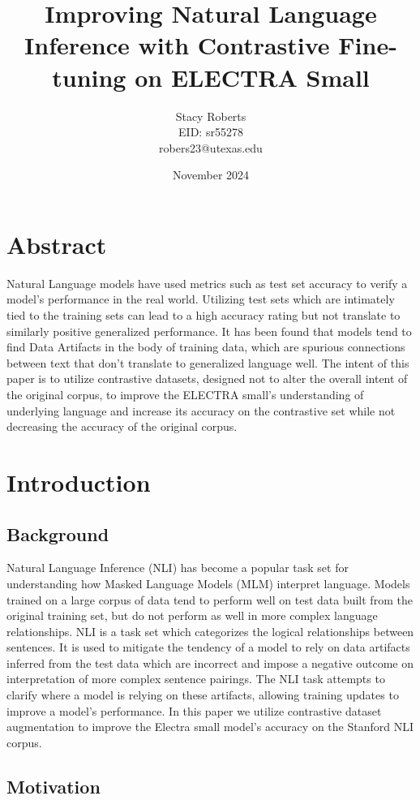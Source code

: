 \documentclass[11pt]{article}
\title{Improving Natural Language Inference with Contrastive Fine-tuning on ELECTRA Small}
\author{Stacy Roberts \\ EID: sr55278 \\robers23@utexas.edu}
\date{November 2024}
\begin{document}
\maketitle


\section*{Abstract}
Natural Language models have used metrics such as test set accuracy to verify a model's performance in the real world. Utilizing test sets which are intimately tied to the training sets can lead to a high accuracy rating but not translate to similarly positive generalized performance. It has been found that models tend to find Data Artifacts in the body of training data, which are spurious connections between text that don't translate to generalized language well. The intent of this paper is to utilize contrastive datasets, designed not to alter the overall intent of the original corpus, to improve the ELECTRA small's understanding of underlying language and increase its accuracy on the contrastive set while not decreasing the accuracy of the original corpus.

\section{Introduction}
\subsection{Background}
Natural Language Inference (NLI) has become a popular task set for understanding how Masked Language Models (MLM) interpret language. Models trained on a large corpus of data tend to perform well on test data built from the original training set, but do not perform as well in more complex language relationships.  NLI is a task set which categorizes the logical relationships between sentences.  It is used to mitigate the tendency of a model to rely on data artifacts inferred from the test data which are incorrect and impose a negative outcome on interpretation of more complex sentence pairings. The NLI task attempts to clarify where a model is relying on these artifacts, allowing training updates to improve a model's performance. In this paper we utilize contrastive dataset augmentation to improve the Electra small model's accuracy on the Stanford NLI corpus.

\subsection{Motivation}
\end{document}
